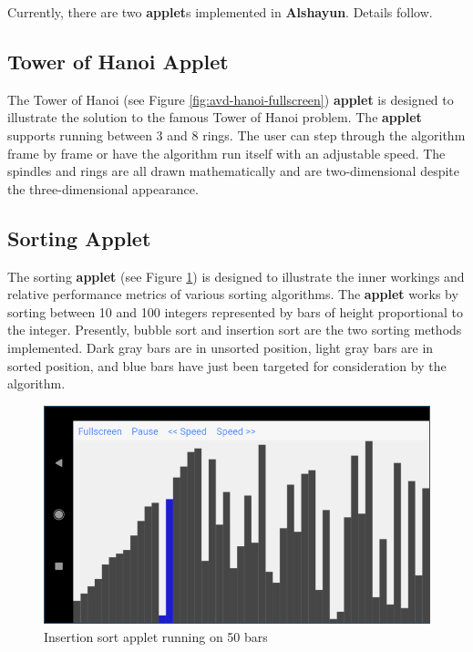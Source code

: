 \documentclass[12pt]{report}
\begin{document}
Currently, there are two \textbf{applet}s implemented in \textbf{Alshayun}.
Details follow.

        \subsection{Tower of Hanoi Applet}
        
The Tower of Hanoi (see Figure \ref{fig:avd-hanoi-fullscreen}) \textbf{applet}
is designed to illustrate the solution to the famous Tower of Hanoi problem. The
\textbf{applet} supports running between 3 and 8 rings. The user can step
through the algorithm frame by frame or have the algorithm run itself with an
adjustable speed. The spindles and rings are all drawn mathematically and are
two-dimensional despite the three-dimensional appearance.

        \subsection{Sorting Applet}

The sorting \textbf{applet} (see Figure \ref{fig:avd-sort-fullscreen}) is
designed to illustrate the inner workings and relative performance metrics of
various sorting algorithms. The \textbf{applet} works by sorting between 10 and
100 integers represented by bars of height proportional to the integer.
Presently, bubble sort and insertion sort are the two sorting methods
implemented. Dark gray bars are in unsorted position, light gray bars are in
sorted position, and blue bars have just been targeted for consideration by the
algorithm.

\begin{figure}
    \centering
    \includegraphics[scale=0.5]{images/avd-sort-fullscreen.png}
    \caption{Insertion sort applet running on 50 bars}
    \label{fig:avd-sort-fullscreen}
\end{figure}
\end{document}
